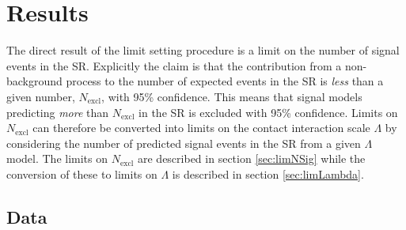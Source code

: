 \section{Results}\label{sec:ciResults}

The direct result of the limit setting procedure is a limit on the number of signal events in the SR. Explicitly the claim is that the contribution from a non-background process to the number of expected events in the SR is \emph{less} than a given number, $N_\text{excl}$, with 95\% confidence. This means that signal models predicting \emph{more} than $N_\text{excl}$ in the SR is excluded with 95\% confidence. Limits on $N_\text{excl}$ can therefore be converted into limits on the contact interaction scale $\Lambda$ by considering the number of predicted signal events in the SR from a given $\Lambda$ model. The limits on $N_\text{excl}$ are described in section \ref{sec:limNSig} while the conversion of these to limits on $\Lambda$ is described in section \ref{sec:limLambda}.

\label{sec:Data}
\subsection{Data}

